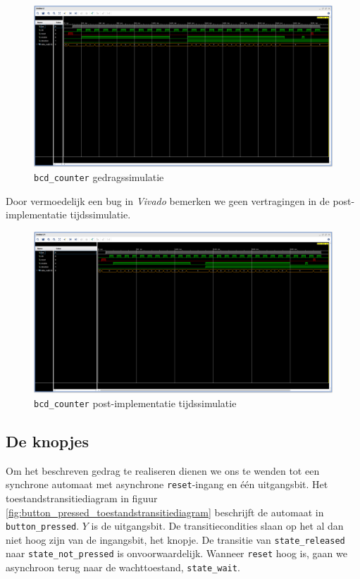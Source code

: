 \documentclass[titlepage]{article}
\begin{document}
\begin{figure}[h!]
    \centering
    \includegraphics[trim={0 500px 0 0}, clip, width=0.8\linewidth]{bcd_counter_gedragssimulatie.PNG}
    \caption{\texttt{bcd\_counter} gedragssimulatie}
    \label{fig:bcd_counter_gedragssimulatie}
\end{figure}

Door vermoedelijk een bug in \textit{Vivado} bemerken we geen vertragingen in de post-implementatie tijdssimulatie.

\begin{figure}[h!]
    \centering
    \includegraphics[trim={0 500px 0 0}, clip, width=0.8\linewidth]{bcd_counter_tijdssimulatie.PNG}
    \caption{\texttt{bcd\_counter} post-implementatie tijdssimulatie}
    \label{fig:bcd_counter_tijdssimulatie}
\end{figure}

\subsection{De knopjes}

Om het beschreven gedrag te realiseren dienen we ons te wenden tot een synchrone automaat met asynchrone \texttt{reset}-ingang en één uitgangsbit.
Het toestandstransitiediagram in figuur \ref{fig:button_pressed_toestandstransitiediagram} beschrijft de automaat in \texttt{button\_pressed}.
\( Y \) is de uitgangsbit.
De transitiecondities slaan op het al dan niet hoog zijn van de ingangsbit, het knopje.
De transitie van \texttt{state\_released} naar \texttt{state\_not\_pressed} is onvoorwaardelijk.
Wanneer \texttt{reset} hoog is, gaan we asynchroon terug naar de wachttoestand, \texttt{state\_wait}.
\end{document}
